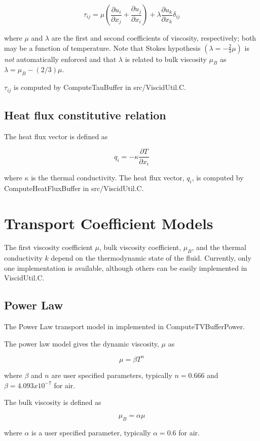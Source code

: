 \[ \tau_{ij} = \mu \left(\frac{\partial u_i}{\partial x_j} + \frac{\partial u_j}{\partial x_i}\right) + \lambda \frac{\partial u_k}{\partial x_k}\delta_{ij} \]

where $\mu$ and $\lambda$ are the first and second coefficients of viscosity, respectively; both may be a function of temperature. Note that Stokes\textquotesingle{} hypothesis $(\lambda = -\frac{2}{3}\mu)$ is {\itshape not} automatically enforced and that $\lambda$ is related to bulk viscosity $\mu_B$ as $\lambda = \mu_B - (2/3)\mu$.

$\tau_{ij}$ is computed by Compute\+Tau\+Buffer in src/\+Viscid\+Util.\+C.\hypertarget{theory_heat}{}\subsection{Heat flux constitutive relation}\label{theory_heat}
The heat flux vector is defined as

\[ q_i = - \kappa \frac{\partial T}{\partial x_i} \]

where $\kappa$ is the thermal conductivity. The heat flux vector, $q_i$, is computed by Compute\+Heat\+Flux\+Buffer in src/\+Viscid\+Util.\+C.\hypertarget{theory_trans}{}\section{Transport Coefficient Models}\label{theory_trans}
The first viscosity coefficient $\mu$, bulk viscosity coefficient, $\mu_B$, and the thermal conductivity $k$ depend on the thermodynamic state of the fluid. Currently, only one implementation is available, although others can be easily implemented in Viscid\+Util.\+C.\hypertarget{theory_transModelPower}{}\subsection{Power Law}\label{theory_transModelPower}
The Power Law transport model in implemented in Compute\+T\+V\+Buffer\+Power.

The power law model gives the dynamic viscosity, $\mu$ as

\[ \mu = \beta T^n \]

where $\beta$ and $n$ are user specified parameters, typically $n = 0.666$ and $\beta = 4.093 x 10^{-7}$ for air.

The bulk viscosity is defined as

\[ \mu_B = \alpha \mu \]

where $\alpha$ is a user specified parameter, typically $\alpha = 0.6$ for air.

